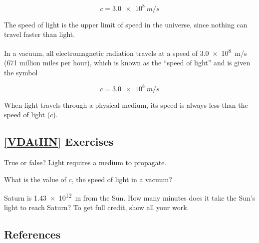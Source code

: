 \documentclass{article}
\numberwithin{equation}{section}
\numberwithin{figure}{section}
\begin{document}
\begin{equation}
    c = \SI{3.0e8}{m/s}
\end{equation}

The speed of light is the upper limit of speed in the universe, since nothing can travel faster than light.

In a vacuum, all electromagnetic radiation travels at a speed of \SI{3.0e8}{m/s} (671 million miles per hour), which is known as the ``speed of light'' and is given the symbol

\begin{equation*}
    c = \SI{3.0e8}{m/s}
\end{equation*}

When light travels through a physical medium, its speed is always less than the speed of light ($c$).

\subsection*{\ref{VDAtHN} Exercises}

\begin{exercise}
    True or false? Light requires a medium to propagate.
\end{exercise}

\begin{exercise}
    What is the value of $c$, the speed of light in a vacuum?
\end{exercise}

\begin{exercise}
    Saturn is \SI{1.43e12}{m} from the Sun. How many minutes does it take the Sun’s light to reach Saturn? To get full credit, show all your work.
\end{exercise}

\clearpage
\subsection*{References}
\end{document}
